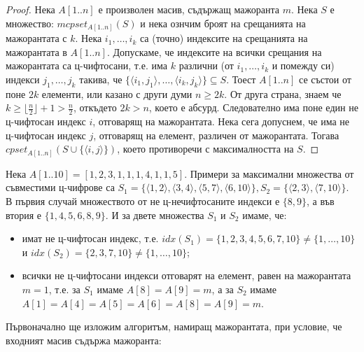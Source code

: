 \begin{solution}
	\begin{proof}
		Нека $A[1..n]$ е произволен масив, съдържащ мажоранта $m$. Нека $S$ е множество: $mcpset_{A[1..n]}(S)$ и нека ознчим броят на срещанията на мажорантата с $k$. Нека $i_1,\dots,i_k$ са (точно) индексите на срещанията на мажорантата в $A[1..n]$. Допускаме, че индексите на всички срещания на мажорантата са ц-чифтосани, т.е. има $k$ различни (от $i_1,\dots,i_k$ и помежду си) индекси $j_1,\dots,j_k$ такива, че $\{\langle i_1,j_1\rangle,\dots,\langle i_k,j_k\rangle\}\subseteq S$. Тоест $A[1..n]$ се състои от поне $2k$ елементи, или казано с други думи $n\ge2k$. От друга страна, знаем че $k\ge\lfloor\frac n2\rfloor+1>\frac n2$, откъдето $2k>n$, което е абсурд. Следователно има поне един не ц-чифтосан индекс $i$, отговарящ на мажорантата. Нека сега допуснем, че има не ц-чифтосан индекс $j$, отговарящ на елемент, различен от мажорантата. Тогава $cpset_{A[1..n]}(S\cup\{\langle i,j\rangle\})$, което противоречи с максималността на $S$. 
	\end{proof}

	\vspace{0.3cm}

	\begin{examplecp}
		Нека $A[1..10]=[1,2,3,1,1,1,4,1,1,5]$. Примери за максимални множества от съвместими ц-чифрове са $S_1=\{\langle1,2\rangle,\langle3,4\rangle,\langle5,7\rangle,\langle6,10\rangle\},S_2=\{\langle2,3\rangle,\langle7,10\rangle\}$. В първия случай множеството от не ц-нечифтосаните индекси е $\{8,9\}$, а във втория е $\{1,4,5,6,8,9\}$. И за двете множества $S_1$ и $S_2$ имаме, че:
		\begin{itemize}
			\item имат не ц-чифтосан индекс, т.е. $idx(S_1)=\{1,2,3,4,5,6,7,10\}\ne\{1,\dots,10\}$ и $idx(S_2)=\{2,3,7,10\}\ne\{1,\dots,10\}$;
			\item всички не ц-чифтосани индекси отговарят на елемент, равен на мажорантата $m=1$, т.е. за $S_1$ имаме $A[8]=A[9]=m$, а за $S_2$ имаме $A[1]=A[4]=A[5]=A[6]=A[8]=A[9]=m$.
		\end{itemize}
	\end{examplecp}\noindent\newline

	\noindent
	Първоначално ще изложим алгоритъм, намиращ мажорантата, при условие, че входният масив съдържа мажоранта:
	\begin{pseudocode}
		

\end{pseudocode}
\end{solution}
